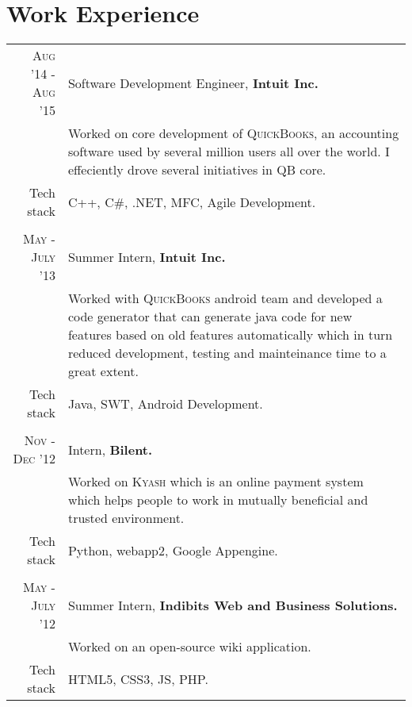 \documentclass[a4paper]{article} %
\begin{document}
\section{Work Experience}
\renewcommand{\arraystretch}{0.85}%
\begin{tabular}{r|p{12cm}}
\textsc{Aug '14 - Aug '15} & Software Development Engineer, \textbf{Intuit Inc.} \\
& \small{Worked on core development of \textsc{QuickBooks}, an accounting software used by several million users all over the world. I effeciently drove several initiatives in QB core.}\\
\small{Tech stack} &\footnotesize{C++, C\#, .NET, MFC, Agile Development.} \\
\multicolumn{2}{c}{} \\

\textsc{May - July '13} & Summer Intern, \textbf{Intuit Inc.}\\ 
& \small{Worked with \textsc{QuickBooks} android  team and developed a code generator that can generate java code for new features based on old features automatically which in turn reduced development, testing and mainteinance time to a great extent.}\\
\small{Tech stack} &\footnotesize{Java, SWT, Android Development.} \\
\multicolumn{2}{c}{} \\


\textsc{Nov - Dec '12} & Intern, \textbf{Bilent.}\\
& \small{Worked on \textsc{Kyash} which is an online payment system which helps people to
work in mutually beneficial and trusted environment.}\\
\small{Tech stack} &\footnotesize{Python, webapp2, Google Appengine.} \\
\multicolumn{2}{c}{} \\


\textsc{May - July '12} & Summer Intern, \textbf{Indibits Web and Business Solutions.}\\
& \small{Worked on an open-source wiki application.}\\
\small{Tech stack} &\footnotesize{HTML5, CSS3, JS, PHP.} \\
\end{tabular}
\end{document}
